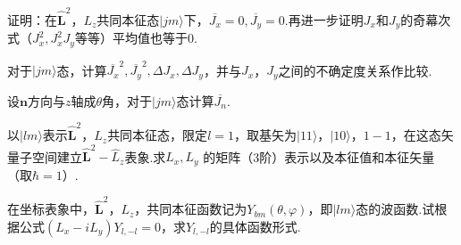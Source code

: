 \begin{exercises}
\exercise 证明：在$\hat{\boldsymbol{L}}^{2}$，$L_{z}$共同本征态$|jm \rangle $下，$\overline{J_{x}}=0,\overline{J_{y}}=0$.再进一步证明$J_{x}$和$J_{y}$的奇幕次式（$J_{x}^{2},J_{x}^{2}J_{y}$等等）平均值也等于0.

\exercise 对于$|jm \rangle $态，计算$\overline{J_{x}}^{2},\overline{J_{y}}^{2},\Delta J_{x},\Delta J_{y}$，并与$J_{x}$，$J_{y}$之间的不确定度关系作比较.

\exercise 设$\boldsymbol{n}$方向与$z$轴成$\theta$角，对于$|jm\rangle$态计算$\overline{J_{n}}$.

\exercise 以$|lm\rangle$表示$\hat{\boldsymbol{L}}^{2}$，$L_{z}$共同本征态，限定$l=1$，取基矢为$|11 \rangle $，$|10\rangle$，$1-1$，在这态矢量子空间建立$\hat{\boldsymbol{L}}^{2}-\hat{L}_{z}$表象.求$L_{x},L_{y}$ 的矩阵（3阶）表示以及本征值和本征矢量（取$\hbar=1$）.

\exercise 在坐标表象中，$\hat{\boldsymbol{L}}^{2}$，$L_{z}$，共同本征函数记为$Y_{bm}(\theta,\varphi)$，即$|lm\rangle $态的波函数.试根据公式$(L_{x}-iL_{y})Y_{l,-l}=0$，求$Y_{l,-l}$的具体函数形式.

\end{exercises}
